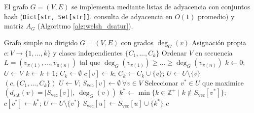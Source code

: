 \documentclass[12pt,a4paper]{article}
\theoremstyle{definition}
\begin{document}
El grafo $G = (V, E)$ se implementa mediante listas de adyacencia con conjuntos hash (\texttt{Dict[str, Set[str]]}, consulta de adyacencia en $O(1)$ promedio) y matriz $A_G$ (Algoritmo \ref{alg:welsh_dsatur}).

\begin{singlespace}
\begin{algorithm}[H]
\caption{Procedimientos Voraces de Coloración: Welsh-Powell y DSatur}
\label{alg:welsh_dsatur}
\scriptsize
\begin{algorithmic}[1]
\Require Grafo simple no dirigido $G = (V, E)$ con grados $\deg_G(v)$
\Ensure Asignación propia $c: V \to \{1, \dots, k\}$ y clases independientes $\{C_1, \dots, C_k\}$
    \State Ordenar $V$ en secuencia $L = (v_{\pi(1)}, \dots, v_{\pi(n)})$ tal que $\deg_G(v_{\pi(1)}) \ge \dots \ge \deg_G(v_{\pi(n)})$
    \State $k \gets 0$; \quad $U \gets V$ 
        \State $k \gets k + 1$; \quad $C_k \gets \emptyset$
             \State $c[v] \gets k$; \quad $C_k \gets C_k \cup \{v\}$; \quad $U \gets U \setminus \{v\}$ \EndIf
        \EndFor
    \EndWhile
    \State \Return $(c, \{C_1, \dots, C_k\})$
\EndFunction
{}
    \State $U \gets V$; \quad $S_{\text{vec}}[v] \gets \emptyset\ \forall v \in V$ 
        \State Seleccionar $v^* \in U$ que maximice $(d_{\text{sat}}(v) = |S_{\text{vec}}[v]|,\ \deg_G(v))$
        \State $k^* \gets \min \{k \in \mathbb{Z}^+ \mid k \notin S_{\text{vec}}[v^*]\}$; \quad $c[v^*] \gets k^*$; \quad $U \gets U \setminus \{v^*\}$
         \State $S_{\text{vec}}[u] \gets S_{\text{vec}}[u] \cup \{k^*\}$ \EndFor
    \EndFor
    \State \Return $c$
\EndFunction
\end{algorithmic}
\end{algorithm}
\end{singlespace}
\end{document}
